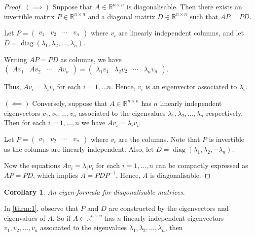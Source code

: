 \documentclass[a4paper]{article}
\theoremstyle{plain}
\newtheorem{corollary}[theorem]{Corollary}
\theoremstyle{definition}
\begin{document}
\begin{proof}
	$(\implies)$ Suppose that $A\in\mathbb{R}^{n\times n}$ is diagonalisable. Then there exists an invertible matrix
	$P\in\mathbb{R}^{n\times n}$ and a diagonal matrix $D\in\mathbb{R}^{n\times n}$ such that $AP=PD$.

	Let $P=\begin{pmatrix}v_1 & v_2 & \cdots & v_n \end{pmatrix}$ where $v_i$ are linearly independent columns, and let
	$D=\operatorname{diag}(\lambda_1,\lambda_2,\ldots,\lambda_n)$.

	Writing $AP=PD$ as columns, we have $\begin{pmatrix}Av_1 & Av_2 & \cdots & Av_n\end{pmatrix}=
		\begin{pmatrix}\lambda_1v_1 & \lambda_2v_2 & \cdots & \lambda_nv_n\end{pmatrix}$.

	Thus, $Av_i=\lambda_iv_i$ for each $i=1,\ldots n$. Hence, $v_i$ is an eigenvector associated to $\lambda_i$.

	$(\impliedby)$ Conversely, suppose that $A\in\mathbb{R}^{n\times n}$ has $n$ linearly independent eigenvectors
	$v_1,v_2,\ldots,v_n$ associated to the eigenvalues $\lambda_1,\lambda_2,\ldots,\lambda_n$ respectively. Then for each
	$i=1,\ldots,n$ we have $Av_i=\lambda_iv_i$.

	Let $P=\begin{pmatrix}v_1 & v_2 & \cdots & v_n\end{pmatrix}$ where $v_i$ are the columns. Note that $P$ is invertible
	as the columns are linearly independent. Also, let $D=\operatorname{diag}(\lambda_1,\lambda_2,\cdots\lambda_n)$.

	Now the equations $Av_i=\lambda_iv_i$ for each $i=1,\ldots,n$ can be compactly expressed as $AP=PD$, which implies
	$A=PDP^{-1}$. Hence, $A$ is diagonalisable.
\end{proof}

\begin{corollary}
	\label{cor:2}
	An eigen-formula for diagonalisable matrices.
\end{corollary}

In \ref{thrm:1}, observe that $P$ and $D$ are constructed by the eigenvectors and eigenvalues of $A$. So if
$A\in\mathbb{R}^{n\times n}$ has $n$ linearly independent eigenvectors $v_1,v_2,\ldots,v_n$ associated to the eigenvalues
$\lambda_1,\lambda_2,\ldots,\lambda_n$, then
\end{document}
